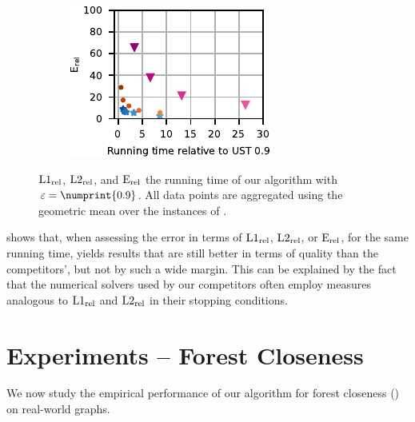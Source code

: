 \begin{figure}[tb]
\begin{subfigure}{.3\textwidth}
\end{subfigure}\hfill
\begin{subfigure}{.3\textwidth}
\centering
\includegraphics[width=\textwidth]{sources/plots/el-clos/relative-error.pdf}
\end{subfigure}
\caption{$\mathrm{L1}_\mathrm{rel}$, $\mathrm{L2}_\mathrm{rel}$, and $\mathrm{E}_\mathrm{rel}$ \wrt the running time of our algorithm
with $\epsilon = \numprint{0.9}$. All data points are aggregated using the geometric
mean over the instances of .}
\label{fig:el-clos:el-clos-quality-rel}
\end{figure}

 shows that, when assessing the error in
terms of $\mathrm{L1}_\mathrm{rel}$, $\mathrm{L2}_\mathrm{rel}$, or $\mathrm{E}_\mathrm{rel}$, for the same running time, \ust
yields results that are still better in terms of quality than the competitors',
but not by such a wide margin. This can be explained by the fact that the numerical
solvers used by our competitors often employ measures analogous to $\mathrm{L1}_\mathrm{rel}$
and $\mathrm{L2}_\mathrm{rel}$ in their stopping conditions.

\section{Experiments -- Forest Closeness}
\label{sec:el-clos:exp-forest}

We now study the empirical performance of our algorithm for forest closeness
() on real-world graphs.


